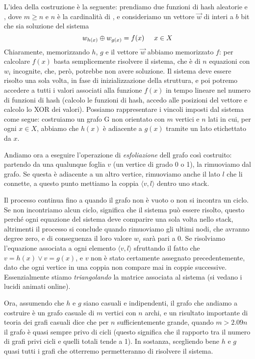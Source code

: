 L'idea della costruzione è la seguente: prendiamo due funzioni di hash aleatorie  e , dove $m \geq n$ e $n$ è la cardinalità di , e consideriamo un vettore $\vec{w}$ di interi a $b$ bit che sia soluzione del sistema
\begin{equation*}
    w_{h(x)} \oplus w_{g(x)} = f(x) \hspace{5mm} x \in X
\end{equation*}
Chiaramente, memorizzando $h$, $g$ e il vettore $\vec{w}$ abbiamo memorizzato $f$: per calcolare $f(x)$ basta semplicemente risolvere il sistema, che è di $n$ equazioni con $w_i$ incognite, che, però, potrebbe non avere soluzione. Il sistema deve essere risolto una sola volta, in fase di inizializzazione della struttura, e poi potremo accedere a tutti i valori associati alla funzione $f(x)$ in tempo lineare nel numero di funzioni di hash (calcolo le funzioni di hash, accedo alle posizioni del vettore e calcolo lo XOR dei valori). Possiamo rappresentare i vincoli imposti dal sistema come segue: costruiamo un grafo G non orientato con $m$ vertici e $n$ lati in cui, per ogni $x \in X$, abbiamo che $h(x)$ è adiacente a $g(x)$ tramite un lato etichettato da $x$.

Andiamo ora a eseguire l'operazione di \textit{esfoliazione} dell grafo così costruito: partendo da una qualunque foglia $v$ (un vertice di grado 0 o 1), la rimuoviamo dal grafo. Se questa è adiacente a un altro vertice, rimuoviamo anche il lato $l$ che li connette, a questo punto mettiamo la coppia $\langle v, l \rangle$ dentro uno stack.

Il processo continua fino a quando il grafo non è vuoto o non si incontra un ciclo. Se non incontriamo alcun ciclo, significa che il sistema può essere risolto, questo perché ogni equazione del sistema deve comparire una sola volta nello stack, altrimenti il processo si conclude quando rimuoviamo gli ultimi nodi, che avranno degree zero, e di conseguenza il loro valore $w_i$ sarà pari a 0. Se risolviamo l'equazione associata a ogni elemento $\langle v, l \rangle$ sfruttando il fatto che $v = h(x) \lor v = g(x)$, e $v$ non è stato certamente assegnato precedentemente, dato che ogni vertice in una coppia non compare mai in coppie successive. Essenzialmente stiamo \textit{triangolando} la matrice associata al sistema (si vedano i lucidi animati online).

Ora, assumendo che $h$ e $g$ siano casuali e indipendenti, il grafo che andiamo a costruire è un grafo casuale di $m$ vertici con $n$ archi, e un risultato importante di teoria dei grafi casuali dice che per $n$ sufficientemente grande, quando $m > 2.09n$ il grafo è quasi sempre privo di cicli (questo significa che il rapporto tra il numero di grafi privi cicli e quelli totali tende a 1). In sostanza, scegliendo bene $h$ e $g$ quasi tutti i grafi che otterremo permetteranno di risolvere il sistema.

